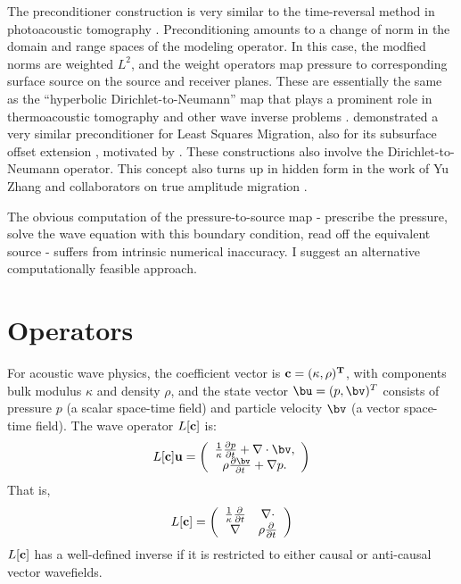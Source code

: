 The preconditioner construction is very similar to the time-reversal
method in photoacoustic tomography
\cite[]{StefanovUhlmannIP:09}. Preconditioning amounts to a change of
norm in the domain and range spaces of the modeling operator. In this
case, the modfied norms are weighted $L^2$, and the weight operators
map pressure to corresponding surface source on the source and
receiver planes. These are essentially the same as the ``hyperbolic
Dirichlet-to-Neumann'' map that plays a prominent role in
thermoacoustic tomography and other wave inverse problems
\cite[]{Rachele:00,StefUhl:05}. \cite{HouSymes:EAGE16} demonstrated a
very similar preconditioner for Least Squares Migration, also for its
subsurface offset extension \cite[]{HouSymes:16}, motivated by
\cite{tenKroode:12}. These constructions also involve the
Dirichlet-to-Neumann operator. This concept also turns up in hidden
form in the work of Yu Zhang and collaborators on true amplitude
migration
\cite[]{YuZhang:14,TangXuZhang:13,XuWang:2012,XuZhangTang:11,Zhang:SEG09,Zhang
  YuSun:08,ZhangSunGray:07,ZhangBleistein:05,Bleisteinetal:05}.

The obvious computation of the pressure-to-source map
- prescribe the pressure, solve the wave equation with this boundary
condition, read off the equivalent source - suffers from intrinsic
numerical inaccuracy. I suggest an alternative computationally
feasible approach.

\section{Operators}

For acoustic wave physics, the coefficient vector is
$\bf{c}=(\kappa,\rho)^T$, with components bulk modulus $\kappa$ and
density $\rho$, and the state vector $\bu=(p,\bv)^T$ consists of
pressure $p$ (a scalar space-time field) and particle velocity $\bv$
(a vector space-time field). The wave operator $L[\bf{c}]$ is:
\begin{equation}
\label{eqn:aweop}
L[\bf{c}]\bf{u} = 
\left(
\begin{array}{c}
\frac{1}{\kappa}\frac{\partial p}{\partial t}  + \nabla \cdot \bv, \\
\rho\frac{\partial \bv}{\partial t} + \nabla p.
\end{array}
\right) 
\end{equation}
That is,
\begin{equation}
  \label{eqn:awemat}
  L[{\bf c}] = \left(
    \begin{array}{cc}
      \frac{1}{\kappa}\frac{\partial}{\partial t} & \nabla \cdot \\
      \nabla & \rho \frac{\partial}{\partial t}
    \end{array}
  \right)
\end{equation}
$L[{\bf c}]$ has a well-defined inverse if it is restricted to either
causal or anti-causal vector wavefields.

